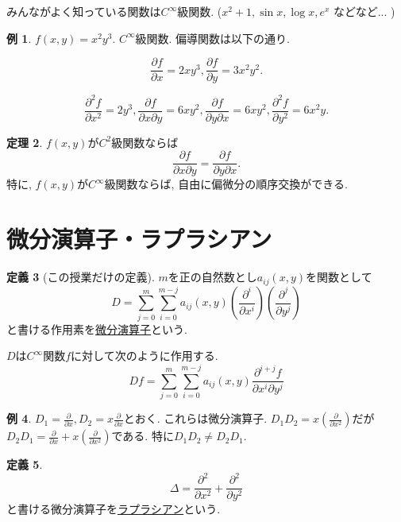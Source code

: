 \documentclass[dvipdfmx,a4paper,11pt]{article}
\theoremstyle{definition}
\newtheorem{thm}{定理}
\newtheorem{dfn}[thm]{定義}
\newtheorem{exa}[thm]{例}
\newcommand{\pdrv}[2]{\frac{\partial #1}{\partial #2}}
\newcommand{\ppdrv}[3]{\frac{\partial #1}{\partial #2 \partial #3}}
\begin{document}
みんながよく知っている関数は$C^{\infty}$級関数.
($x^2+1, \sin x, \log x, e^x$ などなど... )
\begin{exa}
$f(x,y) = x^2 y^3$. $C^{\infty}$級関数. 偏導関数は以下の通り.

$$
\pdrv{f}{x}=2xy^3,  \pdrv{f}{y}=3x^2y^2.
$$

$$
\pdrv{^2f}{x^2} = 2y^3, 
\ppdrv{f}{x}{y} =6xy^2, 
\ppdrv{f}{y}{x} =6xy^2, 
\pdrv{^2f}{y^2} = 6x^2y.
$$
\end{exa}

\begin{tcolorbox}[
    colback = white,
    colframe = green!35!black,
    fonttitle = \bfseries,
    breakable = true]
    \begin{thm}
$f(x,y)$が$C^2$級関数ならば
$$
\ppdrv{f}{x}{y} =\ppdrv{f}{y}{x}.
$$
特に, $f(x,y)$が$C^\infty$級関数ならば, 自由に偏微分の順序交換ができる.
    \end{thm}
    \end{tcolorbox}

\section{微分演算子・ラプラシアン}

\begin{tcolorbox}[
    colback = white,
    colframe = green!35!black,
    fonttitle = \bfseries,
    breakable = true]
    \begin{dfn}[この授業だけの定義]
$m$を正の自然数とし$a_{ij}(x,y)$を関数として
$$
D = \sum_{j=0}^{m} \sum_{i=0}^{m-j} a_{ij}(x,y) \left( \pdrv{^i}{x^i} \right)\left( \pdrv{^j}{y^{j}} \right)
$$ 
と書ける作用素を\underline{微分演算子}という.

$D$は$C^{\infty}$関数$f$に対して次のように作用する.
$$
Df = \sum_{j=0}^{m} \sum_{i=0}^{m-j} a_{ij}(x,y) {\frac{\partial^{i+j} f}{\partial x^i \partial y^{j}}}
$$
    \end{dfn}
    \end{tcolorbox}
    
 \begin{exa}
 $D_1=\pdrv{}{x}, D_2=x\pdrv{}{x}$とおく. これらは微分演算子.
 $D_1D_2 = x\left( \pdrv{}{x^2} \right)$だが
  $D_2D_1 =\pdrv{}{x} + x\left( \pdrv{}{x^2} \right)$である.
  特に$D_1D_2 \neq D_2D_1$.
 \end{exa}
 
 \begin{tcolorbox}[
    colback = white,
    colframe = green!35!black,
    fonttitle = \bfseries,
    breakable = true]
    \begin{dfn}
$$
\Delta = \pdrv{^2}{x^2} + \pdrv{^2}{y^2}
$$
と書ける微分演算子を\underline{ラプラシアン}という.
    \end{dfn}
    \end{tcolorbox}
\end{document}
